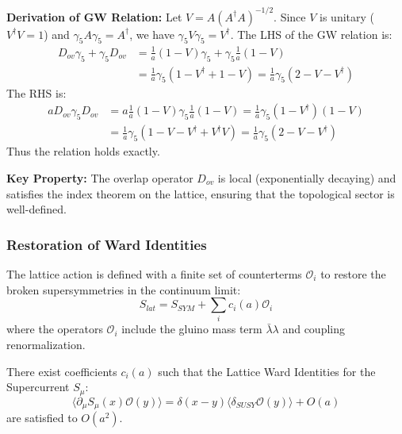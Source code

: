 \textbf{Derivation of GW Relation:}
Let $V = A (A^\dagger A)^{-1/2}$. Since $V$ is unitary ($V^\dagger V = 1$) and $\gamma_5 A \gamma_5 = A^\dagger$, we have $\gamma_5 V \gamma_5 = V^\dagger$.
The LHS of the GW relation is:
\begin{align}
D_{ov} \gamma_5 + \gamma_5 D_{ov} &= \frac{1}{a}(1 - V)\gamma_5 + \gamma_5 \frac{1}{a}(1 - V) \\
&= \frac{1}{a} \gamma_5 (1 - V^\dagger + 1 - V) = \frac{1}{a} \gamma_5 (2 - V - V^\dagger)
\end{align}
The RHS is:
\begin{align}
a D_{ov} \gamma_5 D_{ov} &= a \frac{1}{a}(1 - V) \gamma_5 \frac{1}{a}(1 - V) = \frac{1}{a} \gamma_5 (1 - V^\dagger)(1 - V) \\
&= \frac{1}{a} \gamma_5 (1 - V - V^\dagger + V^\dagger V) = \frac{1}{a} \gamma_5 (2 - V - V^\dagger)
\end{align}
Thus the relation holds exactly.

\textbf{Key Property:} The overlap operator $D_{ov}$ is local (exponentially decaying) and satisfies the index theorem on the lattice, ensuring that the topological sector is well-defined.

\subsubsection{Restoration of Ward Identities}

The lattice action is defined with a finite set of counterterms $\mathcal{O}_i$ to restore the broken supersymmetries in the continuum limit:
\begin{equation}
S_{lat} = S_{SYM} + \sum_{i} c_i(a) \mathcal{O}_i
\end{equation}
where the operators $\mathcal{O}_i$ include the gluino mass term $\bar{\lambda}\lambda$ and coupling renormalization.

\begin{theorem}
There exist coefficients $c_i(a)$ such that the Lattice Ward Identities for the Supercurrent $S_\mu$:
\begin{equation}
\langle \partial_\mu S_\mu(x) \mathcal{O}(y) \rangle = \delta(x-y) \langle \delta_{SUSY} \mathcal{O}(y) \rangle + O(a)
\end{equation}
are satisfied to $O(a^2)$.
\end{theorem}

